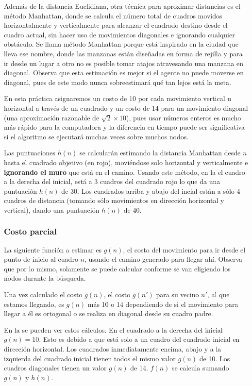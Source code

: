 Además de la distancia Euclidiana, otra técnica para aproximar distancias es el método Manhattan, donde se calcula el número total de cuadros movidos horizontalmente y verticalmente para alcanzar el cuadrado destino desde el cuadro actual, sin hacer uso de movimientos diagonales e ignorando cualquier obstáculo. Se llama método Manhattan porque está inspirado en la ciudad que lleva ese nombre, donde las manzanas están diseñadas en forma de rejilla y para ir desde un lugar a otro no es posible tomar atajos atravesando una manzana en diagonal.  Observa que esta estimación es mejor si el agente no puede moverse en diagonal, pues de este modo nunca sobreestimará qué tan lejos está la meta.

En esta práctica asignaremos un costo de 10 por cada movimiento vertical u horizontal a través de un cuadrado y un costo de 14 para un movimiento diagonal (una aproximación razonable de \(\sqrt{2}\times10\)), pues usar números enteros es mucho más rápido para la computadora y la diferencia en tiempo puede ser significativa si el algoritmo se ejecutará muchas veces sobre muchos nodos.

Las puntuaciones \(h(n)\) se calcularán estimando la distancia Manhattan desde $n$ hasta el cuadrado objetivo (en rojo), moviéndose solo horizontal y verticalmente e \textbf{ignorando el muro} que está en el camino. Usando este método, en la  el cuadro a la derecha del inicial, está a 3 cuadros del cuadrado rojo lo que da una puntuación \(h(n)\) de 30. Los cuadrados arriba y abajo del incial están a sólo 4 cuadros de distancia (tomando sólo movimientos en dirección horizontal y vertical), dando una puntuación \(h(n)\) de 40.


\subsubsection{Costo parcial}

La siguiente función a estimar es \(g(n)\), el costo del movimiento para ir desde el punto de inicio al cuadro \(n\), usando el camino generado para llegar ahí.  Observa que por lo mismo, solamente se puede calcular conforme se van eligiendo los nodos durante la búsqueda.

Una vez calculado el costo \(g(n)\), el costo \(g(n')\) para su vecino $n'$, al que estamos llegando, es \(g(n)\) más 10 o 14 dependiendo de si el movimiento para llegar a él es ortogonal o se realiza en diagonal desde su cuadro padre.

En la  se pueden ver estos cálculos.  En el cuadrado a la derecha del inicial \(g(n)=10\). Esto es debido a que está solo a un cuadro del cuadrado inicial en dirección horizontal. Los cuadrados inmediatamente encima, abajo y a la izquierda del cuadrado inicial tienen todos el mismo valor \(g(n)\) de 10. Los cuadros diagonales tienen un valor \(g(n)\) de 14.  \(f(n)\) se calcula sumando \(g(n)\) y \(h(n)\).


